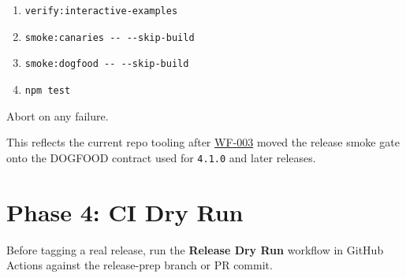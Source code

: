 \begin{enumerate}
  \texttt{t\allowbreak{}e\allowbreak{}s\allowbreak{}t\allowbreak{}:\allowbreak{}f\allowbreak{}r\allowbreak{}a\allowbreak{}m\allowbreak{}e\allowbreak{}s}
\item
  \texttt{v\allowbreak{}e\allowbreak{}r\allowbreak{}i\allowbreak{}f\allowbreak{}y\allowbreak{}:\allowbreak{}i\allowbreak{}n\allowbreak{}t\allowbreak{}e\allowbreak{}r\allowbreak{}a\allowbreak{}c\allowbreak{}t\allowbreak{}i\allowbreak{}v\allowbreak{}e\allowbreak{}-\allowbreak{}e\allowbreak{}x\allowbreak{}a\allowbreak{}m\allowbreak{}p\allowbreak{}l\allowbreak{}e\allowbreak{}s}
\item
  \texttt{s\allowbreak{}m\allowbreak{}o\allowbreak{}k\allowbreak{}e\allowbreak{}:\allowbreak{}c\allowbreak{}a\allowbreak{}n\allowbreak{}a\allowbreak{}r\allowbreak{}i\allowbreak{}e\allowbreak{}s\allowbreak{} \allowbreak{}-\allowbreak{}-\allowbreak{} \allowbreak{}-\allowbreak{}-\allowbreak{}s\allowbreak{}k\allowbreak{}i\allowbreak{}p\allowbreak{}-\allowbreak{}b\allowbreak{}u\allowbreak{}i\allowbreak{}l\allowbreak{}d}
\item
  \texttt{s\allowbreak{}m\allowbreak{}o\allowbreak{}k\allowbreak{}e\allowbreak{}:\allowbreak{}d\allowbreak{}o\allowbreak{}g\allowbreak{}f\allowbreak{}o\allowbreak{}o\allowbreak{}d\allowbreak{} \allowbreak{}-\allowbreak{}-\allowbreak{} \allowbreak{}-\allowbreak{}-\allowbreak{}s\allowbreak{}k\allowbreak{}i\allowbreak{}p\allowbreak{}-\allowbreak{}b\allowbreak{}u\allowbreak{}i\allowbreak{}l\allowbreak{}d}
\item
  \texttt{n\allowbreak{}p\allowbreak{}m\allowbreak{} \allowbreak{}t\allowbreak{}e\allowbreak{}s\allowbreak{}t}
\end{enumerate}

Abort on any failure.

This reflects the current repo tooling after \href{https://github.com/flyingrobots/bijou/blob/cbd70612140e7a450d764b3c7be1c6af878b99bc/docs/design/WF-003-replace-smoke-examples-with-smoke-dogfood.md}{WF-003} moved the release smoke gate onto the DOGFOOD contract used for \texttt{4\allowbreak{}.\allowbreak{}1\allowbreak{}.\allowbreak{}0} and later releases.

\section{Phase 4: CI Dry Run}\label{record-274-phase-4-ci-dry-run}

Before tagging a real release, run the \textbf{Release Dry Run} workflow in GitHub Actions against the release-prep branch or PR commit.

